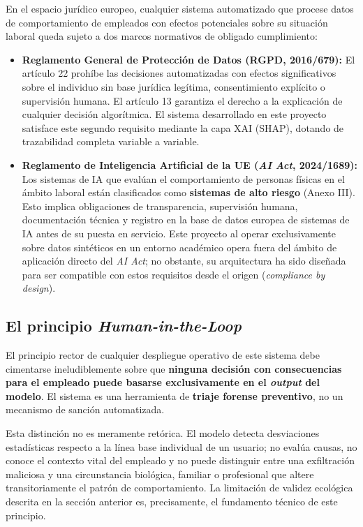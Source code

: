 \documentclass[IB]{TFUOC}%
\begin{document}
En el espacio jurídico europeo, cualquier sistema automatizado que procese 
datos de comportamiento de empleados con efectos potenciales sobre su 
situación laboral queda sujeto a dos marcos normativos de obligado 
cumplimiento:

\begin{itemize}
    \item \textbf{Reglamento General de Protección de Datos (RGPD, 
    2016/679):} El artículo 22 prohíbe las decisiones automatizadas 
    con efectos significativos sobre el individuo sin base jurídica 
    legítima, consentimiento explícito o supervisión humana. El 
    artículo 13 garantiza el derecho a la explicación de cualquier 
    decisión algorítmica. El sistema desarrollado en este proyecto 
    satisface este segundo requisito mediante la capa XAI (SHAP), 
    dotando de trazabilidad completa variable a variable.
    
    \item \textbf{Reglamento de Inteligencia Artificial de la UE 
    (\textit{AI Act}, 2024/1689):} Los sistemas de IA que evalúan 
    el comportamiento de personas físicas en el ámbito laboral 
    están clasificados como \textbf{sistemas de alto riesgo} 
    (Anexo III). Esto implica obligaciones de transparencia, 
    supervisión humana, documentación técnica y registro en la 
    base de datos europea de sistemas de IA antes de su puesta 
    en servicio. Este proyecto al operar exclusivamente sobre 
    datos sintéticos en un entorno académico opera fuera del 
    ámbito de aplicación directo del \textit{AI Act}; no obstante, 
    su arquitectura ha sido diseñada para ser compatible con estos 
    requisitos desde el origen (\textit{compliance by design}).
\end{itemize}

\subsection*{El principio \textit{Human-in-the-Loop}}

El principio rector de cualquier despliegue operativo de este sistema 
debe cimentarse ineludiblemente sobre que \textbf{ninguna decisión con consecuencias para el empleado puede basarse exclusivamente en el \textit{output} del modelo}. El sistema es una herramienta de \textbf{triaje forense preventivo}, no un mecanismo de sanción automatizada.

\medskip
\noindent Esta distinción no es meramente retórica. El modelo detecta desviaciones estadísticas respecto a la línea base individual de un usuario; no evalúa causas, no conoce el contexto vital del empleado y no puede distinguir entre una exfiltración maliciosa y una circunstancia biológica, familiar o profesional que altere transitoriamente el patrón de comportamiento. La limitación de validez ecológica descrita en la sección anterior es, precisamente, el fundamento técnico de este principio.
\end{document}
